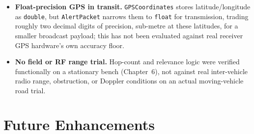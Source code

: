 \documentclass[12pt,a4paper]{report}
\begin{document}
\begin{itemize}[leftmargin=1.6em]
\item \textbf{Float-precision GPS in transit.} \texttt{GPSCoordinates} stores latitude/longitude as \texttt{double}, but \texttt{AlertPacket} narrows them to \texttt{float} for transmission, trading roughly two decimal digits of precision, sub-metre at these latitudes, for a smaller broadcast payload; this has not been evaluated against real receiver GPS hardware's own accuracy floor.

\item \textbf{No field or RF range trial.} Hop-count and relevance logic were verified functionally on a stationary bench (Chapter~6), not against real inter-vehicle radio range, obstruction, or Doppler conditions on an actual moving-vehicle road trial.
\end{itemize}

\section{Future Enhancements}
\end{document}

